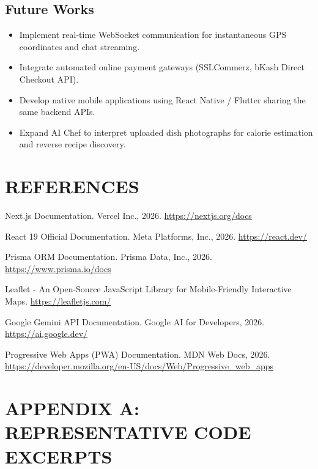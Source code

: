\documentclass[12pt,a4paper]{report}
\begin{document}
\section{Future Works}
\begin{itemize}
    \item Implement real-time WebSocket communication for instantaneous GPS coordinates and chat streaming.
    \item Integrate automated online payment gateways (SSLCommerz, bKash Direct Checkout API).
    \item Develop native mobile applications using React Native / Flutter sharing the same backend APIs.
    \item Expand AI Chef to interpret uploaded dish photographs for calorie estimation and reverse recipe discovery.
\end{itemize}

\newpage

\chapter*{REFERENCES}

\noindent [1] Next.js Documentation. Vercel Inc., 2026. \url{https://nextjs.org/docs}

\noindent [2] React 19 Official Documentation. Meta Platforms, Inc., 2026. \url{https://react.dev/}

\noindent [3] Prisma ORM Documentation. Prisma Data, Inc., 2026. \url{https://www.prisma.io/docs}

\noindent [4] Leaflet - An Open-Source JavaScript Library for Mobile-Friendly Interactive Maps. \url{https://leafletjs.com/}

\noindent [5] Google Gemini API Documentation. Google AI for Developers, 2026. \url{https://ai.google.dev/}

\noindent [6] Progressive Web Apps (PWA) Documentation. MDN Web Docs, 2026. \url{https://developer.mozilla.org/en-US/docs/Web/Progressive_web_apps}

\newpage

\chapter*{APPENDIX A: REPRESENTATIVE CODE EXCERPTS}
\end{document}
